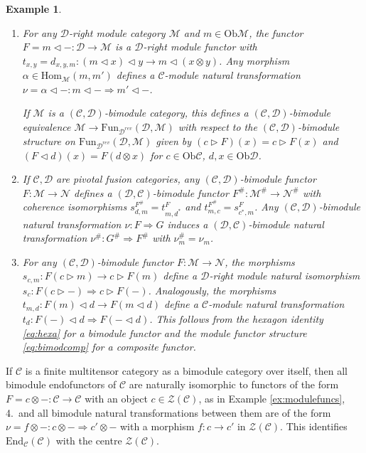 \documentclass[1.5pt, a4paper]{article}
\newcommand{\mac}{\mathcal C}
\newcommand{\mad}{\mathcal D}
\newcommand{\mam}{\mathcal M}
\newcommand{\man}{\mathcal N}
\newcommand{\Hom}{\mathrm{Hom}}
\newcommand{\End}{\mathrm{End}}
\newcommand{\Ob}{\mathrm{Ob}}
\newcommand{\Fun}{\mathrm{Fun}}
\newcommand{\oo}[0]{\otimes}
\newtheorem{example}[theorem]{Example}
\begin{document}
\begin{example}
\begin{enumerate}
If $\mam$ is a $(\mac,\mad)$-bimodule category, this defines a $(\mac,\mad)$-bimodule equivalence $\mam\to \Fun_\mac(\mac,\mam)$ with respect to the $(\mac,\mad)$-bimodule structure on $\Fun_\mac(\mac,\mam)$  given by $(c\rhd F)(x)=F(x\oo c)$ and $(F\lhd d)(x)=F(x)\lhd d$ for $c,x\in\Ob\mac$, $d\in\Ob\mad$.


\item For any $\mad$-right module category $\mam$ and $m\in\Ob \mam$, the functor $F=m\lhd -:\mad\to\mam$ is a $\mad$-right module functor with $t_{x,y}=d_{x,y,m}: (m\lhd x)\lhd y\to m\lhd (x\oo y)$. Any morphism $\alpha\in \Hom_\mam(m,m')$ defines a $\mac$-module natural transformation $\nu= \alpha\lhd -:  m\lhd - \Rightarrow  m'\lhd -$. 

If $\mam$ is a $(\mac,\mad)$-bimodule category, this defines a $(\mac,\mad)$-bimodule equivalence $\mam\to \Fun_{\mad^{rev}}(\mad,\mam)$ with respect to the $(\mac,\mad)$-bimodule structure on $\Fun_{\mad^{rev}}(\mad,\mam)$  given by $(c\rhd F)(x)=c\rhd F(x)$ and $(F\lhd d)(x)=F(d\oo x)$ for $c\in\Ob\mac$, $d,x\in\Ob\mad$.


\item If $\mathcal C,\mathcal D$ are pivotal fusion categories,  any $(\mac,\mad)$-bimodule functor $F: \mam\to\man$ defines a $(\mad,\mac)$-bimodule functor $F^\#:\mam^\#\to\man^\#$ with coherence isomorphisms  $s^{F^\#}_{d,m}=t^F_{m,d^*}$ and $t^{F^\#}_{m,c}=s^F_{c^*,m}$. 
 Any $(\mac,\mad)$-bimodule natural transformation $\nu: F\Rightarrow G$ induces a $(\mad,\mac)$-bimodule natural transformation $\nu^\#: G^\#\Rightarrow F^\#$ with  $\nu^\#_m=\nu_m$.

\item For any $(\mac,\mad)$-bimodule functor $F:\mam\to\man$, the morphisms $s_{c,m}: F(c\rhd m)\to c\rhd F(m)$ define a $\mad$-right module natural isomorphism $s_c: F(c\rhd -)\Rightarrow c\rhd F(-)$. Analogously, the morphisms $t_{m,d}: F(m)\lhd d\to F(m\lhd d)$ define a $\mac$-module natural transformation $t_d: F(-)\lhd d\Rightarrow F(-\lhd d)$. This follows  from the  hexagon identity \eqref{eq:hexa} for a bimodule functor and the  module functor structure  \eqref{eq:bimodcomp} for a composite functor.

\end{enumerate}
\end{example}

If $\mac$ is a finite multitensor category as a bimodule category over itself, then  all bimodule endofunctors of $\mac$ are naturally isomorphic to functors of the  form $F=c\oo -:\mac\to\mac$ with an object $c\in \mathcal Z(\mac)$, as in Example \ref{ex:modulefuncs}, 4.~and all bimodule natural transformations between them are of the form $\nu=f\oo -: c\oo -\Rightarrow c'\oo -$ with a morphism $f: c\to c'$ in $\mathcal Z(\mac)$. This identifies $\End_\mac(\mac)$ with the  centre $\mathcal Z(\mac)$. 
\end{document}
